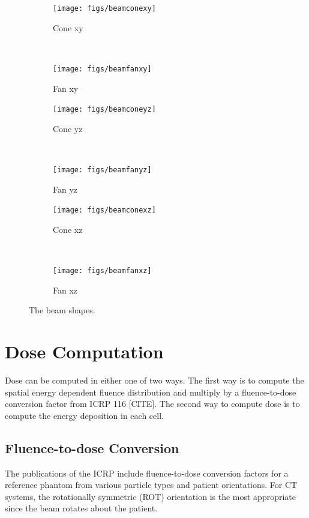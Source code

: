 \begin{figure}
    \centering
    \begin{subfigure}[b]{0.45\textwidth}
        \texttt{[image: figs/beamconexy]}
        \caption{Cone xy}
        \label{fig:beamconexy}
    \end{subfigure}
    ~
    \begin{subfigure}[b]{0.45\textwidth}
        \texttt{[image: figs/beamfanxy]}
        \caption{Fan xy}
        \label{fig:beamfanxy}
    \end{subfigure}

    \begin{subfigure}[b]{0.45\textwidth}
        \texttt{[image: figs/beamconeyz]}
        \caption{Cone yz}
        \label{fig:subsweep_general3}
    \end{subfigure}
    ~
    \begin{subfigure}[b]{0.45\textwidth}
        \texttt{[image: figs/beamfanyz]}
        \caption{Fan yz}
        \label{fig:subsweep_general4}
    \end{subfigure}
    
    \begin{subfigure}[b]{0.45\textwidth}
        \texttt{[image: figs/beamconexz]}
        \caption{Cone xz}
        \label{fig:subsweep_general5}
    \end{subfigure}
    ~
    \begin{subfigure}[b]{0.45\textwidth}
        \texttt{[image: figs/beamfanxz]}
        \caption{Fan xz}
        \label{fig:subsweep_general6}
    \end{subfigure}
    \caption{The beam shapes.}\label{fig:beamfancone}
\end{figure}

\section{Dose Computation}
Dose can be computed in either one of two ways. The first way is to compute the spatial energy dependent fluence distribution and multiply by a fluence-to-dose conversion factor from ICRP 116 [CITE]. The second way to compute dose is to compute the energy deposition in each cell.

\subsection{Fluence-to-dose Conversion}

The publications of the ICRP include fluence-to-dose conversion factors for a reference phantom from various particle types and patient orientations. For CT systems, the rotationally symmetric (ROT) orientation is the most appropriate since the beam rotates about the patient.

